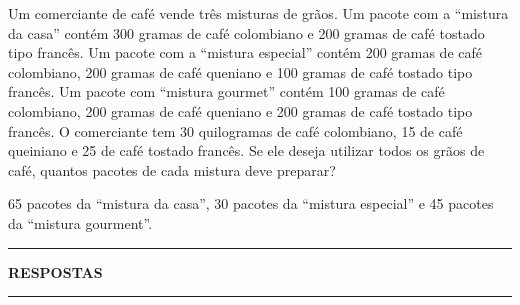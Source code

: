 \documentclass[12pt]{exam}
\begin{document}
\begin{exercicio}
  Um comerciante de café vende três misturas de grãos. Um pacote com a ``mistura da casa'' contém 300 gramas de café colombiano e 200 gramas de café tostado tipo francês. Um pacote com a ``mistura especial'' contém 200 gramas de café colombiano, 200 gramas de café queniano e 100 gramas de café tostado tipo francês. Um pacote com ``mistura gourmet'' contém 100 gramas de café colombiano, 200 gramas de café queniano e 200 gramas de café tostado tipo francês. O comerciante tem 30 quilogramas de café colombiano, 15 de café queiniano e 25 de café tostado francês. Se ele deseja utilizar todos os grãos de café, quantos pacotes de cada mistura deve preparar?
  \begin{solucao}
    65 pacotes da ``mistura da casa'', 30 pacotes da ``mistura especial'' e 45 pacotes da ``mistura gourment''.
  \end{solucao}
\end{exercicio}

\newpage
{}
\hrule
\begin{center}
{\large\bf RESPOSTAS}
\end{center}
\hrule

\end{document}

